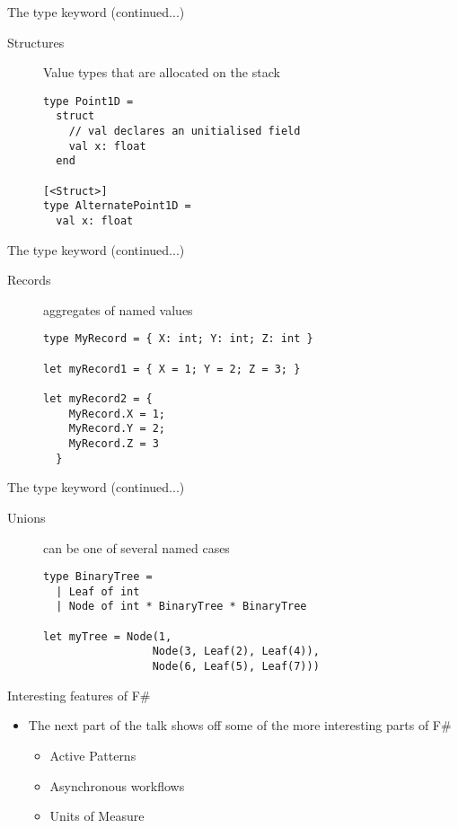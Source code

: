 \documentclass[landscape]{slides}
\begin{document}
\begin{slide}{The type keyword (continued...)}
\begin{description}
\item[Structures] Value types that are allocated on the stack 
\begin{verbatim}
type Point1D =
  struct 
    // val declares an unitialised field 
    val x: float
  end

[<Struct>]
type AlternatePoint1D = 
  val x: float
\end{verbatim}
\end{description}
\end{slide}

\begin{slide}{The type keyword (continued...)}
\begin{description}
\item[Records] aggregates of named values
\begin{verbatim}
type MyRecord = { X: int; Y: int; Z: int }

let myRecord1 = { X = 1; Y = 2; Z = 3; }

let myRecord2 = {
    MyRecord.X = 1; 
    MyRecord.Y = 2; 
    MyRecord.Z = 3 
  }
\end{verbatim}
\end{description}
\end{slide}

\begin{slide}{The type keyword (continued...)}
\begin{description}
\item[Unions] can be one of several named cases 
\begin{verbatim}
type BinaryTree =
  | Leaf of int
  | Node of int * BinaryTree * BinaryTree

let myTree = Node(1, 
                 Node(3, Leaf(2), Leaf(4)), 
                 Node(6, Leaf(5), Leaf(7)))
\end{verbatim}
\end{description}
\end{slide}

\begin{slide}{Interesting features of F\#}
\begin{itemize}
\item The next part of the talk shows off some of the more interesting parts of F\#
\begin{itemize}
\item Active Patterns
\item Asynchronous workflows
\item Units of Measure
\end{itemize}
\end{itemize}
\end{slide}
\end{document}
